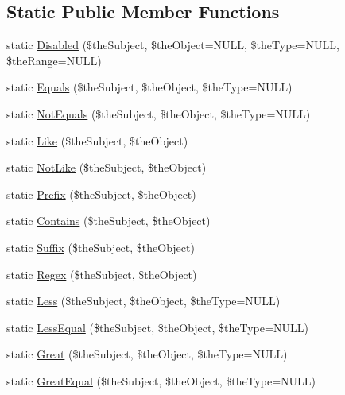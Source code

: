\subsection*{Static Public Member Functions}
\begin{DoxyCompactItemize}
\item 
static \hyperlink{class_c_query_statement_ac14041ddd7df1cca53aa6594aac7872f}{Disabled} (\$the\-Subject, \$the\-Object=N\-U\-L\-L, \$the\-Type=N\-U\-L\-L, \$the\-Range=N\-U\-L\-L)
\item 
static \hyperlink{class_c_query_statement_a37f7b088b60623ba9435fc400276a828}{Equals} (\$the\-Subject, \$the\-Object, \$the\-Type=N\-U\-L\-L)
\item 
static \hyperlink{class_c_query_statement_a3152dfb1a2eda4047a11ffcd2af50846}{Not\-Equals} (\$the\-Subject, \$the\-Object, \$the\-Type=N\-U\-L\-L)
\item 
static \hyperlink{class_c_query_statement_a26fd9aefa3c9df4228f9aaa7b5d74cbc}{Like} (\$the\-Subject, \$the\-Object)
\item 
static \hyperlink{class_c_query_statement_a6c89cfdf83f46e2fd3ca807254236ed7}{Not\-Like} (\$the\-Subject, \$the\-Object)
\item 
static \hyperlink{class_c_query_statement_a343902e7ebf9facbff20bcd9be63794c}{Prefix} (\$the\-Subject, \$the\-Object)
\item 
static \hyperlink{class_c_query_statement_abdc4fa447abbde5aa34959f6b830a7e0}{Contains} (\$the\-Subject, \$the\-Object)
\item 
static \hyperlink{class_c_query_statement_a80232c348a9db646d3a94bd44611918e}{Suffix} (\$the\-Subject, \$the\-Object)
\item 
static \hyperlink{class_c_query_statement_a952e2d252c4a2a469c03a9e96f151d35}{Regex} (\$the\-Subject, \$the\-Object)
\item 
static \hyperlink{class_c_query_statement_af3a8b31af7f32562fb1ce7ba16f69766}{Less} (\$the\-Subject, \$the\-Object, \$the\-Type=N\-U\-L\-L)
\item 
static \hyperlink{class_c_query_statement_a292880d593cc8b46dba77d13004aaa28}{Less\-Equal} (\$the\-Subject, \$the\-Object, \$the\-Type=N\-U\-L\-L)
\item 
static \hyperlink{class_c_query_statement_abe09c835887534aeecbeffad2045c917}{Great} (\$the\-Subject, \$the\-Object, \$the\-Type=N\-U\-L\-L)
\item 
static \hyperlink{class_c_query_statement_a540d93d646384d5a145d3944d72246e3}{Great\-Equal} (\$the\-Subject, \$the\-Object, \$the\-Type=N\-U\-L\-L)

\end{DoxyCompactItemize}
